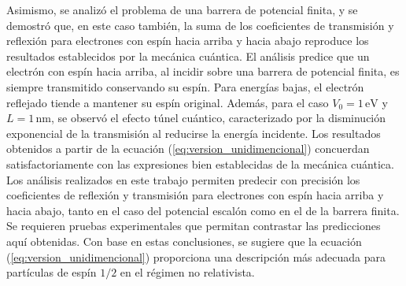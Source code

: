 Asimismo, se analizó el problema de una barrera de potencial finita, y se demostró que, en este caso también, la suma de los coeficientes de transmisión y reflexión para electrones con espín hacia arriba y hacia abajo reproduce los resultados establecidos por la mecánica cuántica. El análisis predice que un electrón con espín hacia arriba, al incidir sobre una barrera de potencial finita, es siempre transmitido conservando su espín. Para energías bajas, el electrón reflejado tiende a mantener su espín original. Además, para el caso \(V_0 = 1\,\mathrm{eV}\) y \(L = 1\,\mathrm{nm}\), se observó el efecto túnel cuántico, caracterizado por la disminución exponencial de la transmisión al reducirse la energía incidente. Los resultados obtenidos a partir de la ecuación (\ref{eq:version_unidimencional}) concuerdan satisfactoriamente con las expresiones bien establecidas de la mecánica cuántica. Los análisis realizados en este trabajo permiten predecir con precisión los coeficientes de reflexión y transmisión para electrones con espín hacia arriba y hacia abajo, tanto en el caso del potencial escalón como en el de la barrera finita. Se requieren pruebas experimentales que permitan contrastar las predicciones aquí obtenidas. Con base en estas conclusiones, se sugiere que la ecuación (\ref{eq:version_unidimencional}) proporciona una descripción más adecuada para partículas de espín \(1/2\) en el régimen no relativista.
